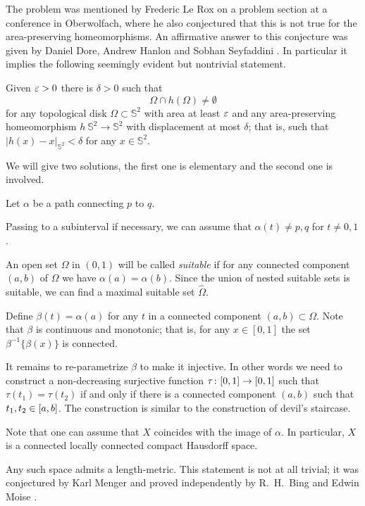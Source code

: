 The problem was mentioned by Frederic Le Rox \cite{rox} on a problem section at a conference in Oberwolfach, 
where he also conjectured that this is not true for the area-preserving homeomorphisms.
An affirmative answer to this conjecture was given by Daniel Dore, Andrew Hanlon and Sobhan Seyfaddini 
\cite{dore-hanlon,seyfaddini}.
In particular it implies the following seemingly evident but nontrivial statement.

\begin{pr}
Given $\varepsilon>0$ there is $\delta>0$ such that 
\[\Omega\cap h(\Omega)\ne\emptyset\]
for any topological disk $\Omega\subset \mathbb{S}^2$ with area at least $\varepsilon$
and 
any area-preserving homeomorphism $h\:\mathbb{S}^2\to\mathbb{S}^2$ with displacement at most $\delta$;
that is, such that $|h(x)-x|_{\mathbb{S}^2}<\delta$ for any $x\in \mathbb{S}^2$. 
\end{pr}


We will give two solutions, the first one is elementary and the second one is involved. 

Let $\alpha$ be a path connecting $p$ to $q$.

Passing to a subinterval if necessary,
we can assume that $\alpha(t)\ne p,q$ for $t\ne0,1$.

An open set $\Omega$ in $(0,1)$ will be called {}\emph{suitable}
if for any connected component $(a,b)$ of $\Omega$ we have $\alpha(a)=\alpha(b)$.
Since the union of nested suitable sets is suitable, we can find a maximal suitable set $\hat \Omega$.

Define $\beta(t)=\alpha(a)$ for any $t$ in a connected component $(a,b)\subset\Omega$.
Note that $\beta$ is continuous and monotonic;
that is, for any $x\in [0,1]$ the set $\beta^{-1}\{\beta(x)\}$ is connected.

It remains to re-parametrize $\beta$ to make it injective.
In other words we need to construct a non-decreasing surjective function $\tau\:[0,1]\z\to[0,1]$ such that 
$\tau(t_1)=\tau(t_2)$ if and only if there is a connected component $(a,b)$ such that $t_1,t_2\z\in [a,b]$.
The construction is similar to the construction of devil's staircase.
\qeds

Note that one can assume that $X$ coincides with the image of $\alpha$.
In particular, $X$ is a connected locally connected compact Hausdorff space.

Any such space admits a length-metric.
This statement is not at all trivial;
it was conjectured by Karl Menger \cite{menger}
and proved independently 
by R.~H.~Bing  \cite{bing-length-0, bing-length-1} 
and Edwin Moise \cite{moise}.

